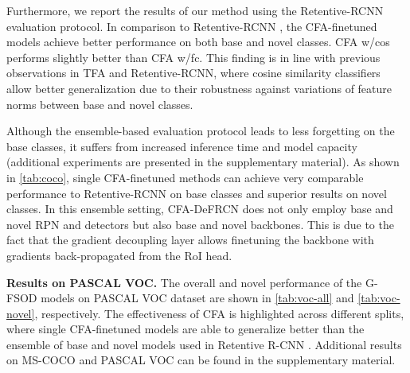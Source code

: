 \documentclass[10pt,twocolumn,letterpaper]{article}
\begin{document}
Furthermore, we report the results of our method using the Retentive-RCNN evaluation protocol. In comparison to Retentive-RCNN \cite{gfsod}, the CFA-finetuned models achieve better performance on both base and novel classes. CFA w/cos performs slightly better than CFA w/fc. This finding is in line with previous observations in TFA \cite{TFA} and Retentive-RCNN\cite{gfsod}, where cosine similarity classifiers allow better generalization due to their robustness against variations of feature norms between base and novel classes. 

Although the ensemble-based evaluation protocol leads to less forgetting on the base classes, it suffers from increased inference time and model capacity (additional experiments are presented in the supplementary material). As shown in \cref{tab:coco}, single CFA-finetuned methods can achieve very comparable performance to Retentive-RCNN \cite{gfsod} on base classes and superior results on novel classes. In this ensemble setting, CFA-DeFRCN does not only employ base and novel RPN and detectors but also base and novel backbones. This is due to the fact that the gradient decoupling layer allows finetuning the backbone with gradients back-propagated from the RoI head. 


\textbf{Results on PASCAL VOC.} The overall and novel performance of the G-FSOD models on PASCAL VOC dataset are shown in \cref{tab:voc-all} and \cref{tab:voc-novel}, respectively. The effectiveness of CFA is highlighted across different splits, where single CFA-finetuned models are able to generalize better than the ensemble of base and novel models used in Retentive R-CNN \cite{gfsod}. Additional results on MS-COCO and PASCAL VOC can be found in the supplementary material.  
\end{document}
